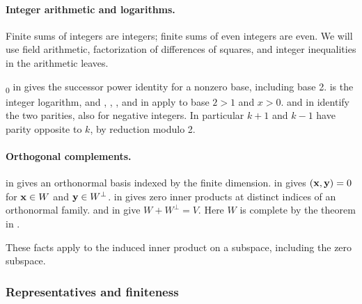 \begin{mergedproofsection}
\paragraph{Integer arithmetic and logarithms.}\label{facts:312-arithmetic}\uses{}
Finite sums of integers are integers; finite sums of even integers are even.
We will use field arithmetic, factorization of differences of squares,
and integer inequalities in the arithmetic leaves.
\begingroup\raggedright
{}\textsubscript{0} in
 gives the successor
power identity for a nonzero base, including base 2.
 is the integer logarithm, and
, ,
, and 
in  apply to base $2>1$ and $x>0$.
 and  in
 identify the two parities,
also for negative integers. In particular $k+1$ and $k-1$ have
parity opposite to $k$, by reduction modulo 2.
\par\endgroup

\paragraph{Orthogonal complements.}\label{facts:312-orthogonal}\uses{}
\begingroup\raggedright
{} in
gives an orthonormal basis indexed by the finite dimension.
 in
 gives
$({\mathbf x},{\mathbf y})=0$ for ${\mathbf x}\in W$ and ${\mathbf y}\in W^\perp$.
 in
 gives zero
inner products at distinct indices of an orthonormal family.
 and
 in
give $W+W^\perp=V$. Here $W$ is complete by the theorem
 in
.
\par\endgroup
These facts apply to the induced inner product on a subspace, including
the zero subspace.

\subsubsection{Representatives and finiteness}


\end{mergedproofsection}
